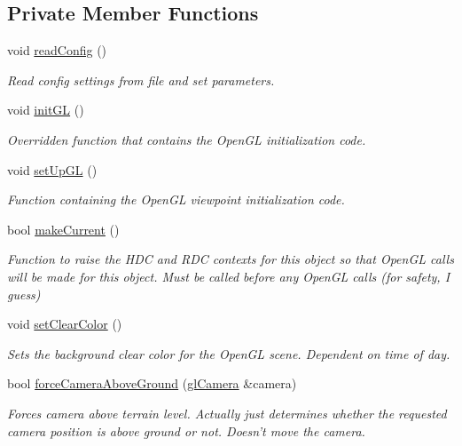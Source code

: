 \subsection*{Private Member Functions}
\begin{DoxyCompactItemize}
\item 
void \hyperlink{class_viewer3_d_adbfc36c7e2acbdfd7a14728d5849bd2c}{readConfig} ()
\begin{DoxyCompactList}\small\item\em Read config settings from file and set parameters. \end{DoxyCompactList}\item 
void \hyperlink{class_viewer3_d_a70f27fc3bfd8603d785e744c601ab5dd}{initGL} ()
\begin{DoxyCompactList}\small\item\em Overridden function that contains the OpenGL initialization code. \end{DoxyCompactList}\item 
void \hyperlink{class_viewer3_d_ad55d722a7c503fa4217835214e7aa842}{setUpGL} ()
\begin{DoxyCompactList}\small\item\em Function containing the OpenGL viewpoint initialization code. \end{DoxyCompactList}\item 
bool \hyperlink{class_viewer3_d_a852d77c8af644e7ea394b7a3e1a9b86b}{makeCurrent} ()
\begin{DoxyCompactList}\small\item\em Function to raise the HDC and RDC contexts for this object so that OpenGL calls will be made for this object. Must be called before any OpenGL calls (for safety, I guess) \end{DoxyCompactList}\item 
void \hyperlink{class_viewer3_d_a36170b1e1ccf0f50f31f99477bb53046}{setClearColor} ()
\begin{DoxyCompactList}\small\item\em Sets the background clear color for the OpenGL scene. Dependent on time of day. \end{DoxyCompactList}\item 
bool \hyperlink{class_viewer3_d_a95cb2a33275703d7fbc29d406eb7d80e}{forceCameraAboveGround} (\hyperlink{classgl_camera}{glCamera} \&camera)
\begin{DoxyCompactList}\small\item\em Forces camera above terrain level. Actually just determines whether the requested camera position is above ground or not. Doesn't move the camera. \end{DoxyCompactList}\item 

\end{DoxyCompactItemize}
